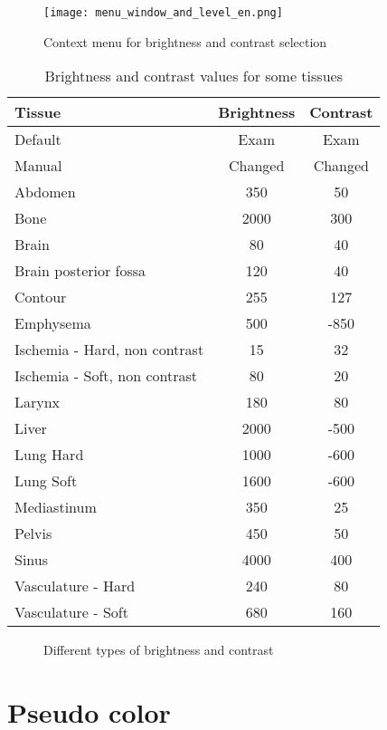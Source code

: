 \begin{figure}[!htb]
\centering
\texttt{[image: menu\_window\_and\_level\_en.png]}
\caption{Context menu for brightness and contrast selection}
\label{fig:window_level}
\end{figure}

\begin{table}[!h]
\centering
\caption{Brightness and contrast values for some tissues}
\begin{tabular}{lcc}\\
\hline %
Tissue & Brightness & Contrast\\
\hline
\hline
Default & Exam & Exam\\
Manual & Changed & Changed\\
Abdomen & 350 & 50\\
Bone & 2000 & 300\\
Brain & 80 & 40\\
Brain posterior fossa & 120 & 40\\
Contour & 255 & 127\\
Emphysema & 500 & -850\\
Ischemia - Hard, non contrast & 15 & 32\\
Ischemia - Soft, non contrast & 80 & 20\\
Larynx & 180 & 80\\
Liver & 2000 & -500\\
Lung Hard & 1000 & -600\\
Lung Soft & 1600 & -600\\
Mediastinum & 350 & 25\\
Pelvis & 450 & 50\\
Sinus & 4000 & 400\\
Vasculature - Hard & 240 & 80\\
Vasculature - Soft & 680 & 160\\
\hline
\end{tabular}
\label{tab:window_level}
\end{table} 

\begin{figure}[!h]
  \centering
   \qquad
  \caption{Different types of brightness and contrast}
  \label{fig:two_window_level}
\end{figure}

\section{Pseudo color}

